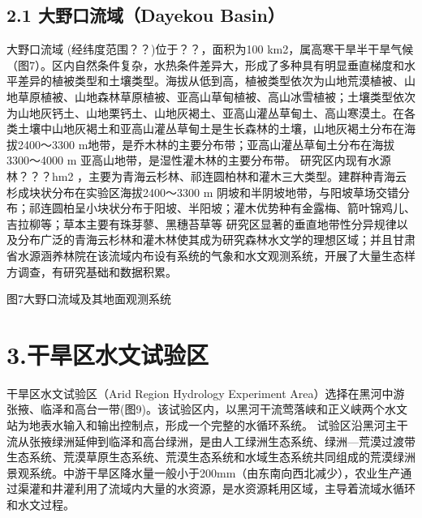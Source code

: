 \documentclass[letterpaper,10pt,english]{sphinxmanual}
\begin{document}
\subsection{2.1 大野口流域（Dayekou Basin）}
\label{water_experiment_area:dayekou-basin}
大野口流域 (经纬度范围？？)位于？？，面积为100 km2，属高寒干旱半干旱气候（图7）。区内自然条件复杂，水热条件差异大，形成了多种具有明显垂直梯度和水平差异的植被类型和土壤类型。海拔从低到高，植被类型依次为山地荒漠植被、山地草原植被、山地森林草原植被、亚高山草甸植被、高山冰雪植被；土壤类型依次为山地灰钙土、山地栗钙土、山地灰褐土、亚高山灌丛草甸土、高山寒漠土。在各类土壤中山地灰褐土和亚高山灌丛草甸土是生长森林的土壤，山地灰褐土分布在海拔2400～3300 m地带，是乔木林的主要分布带；亚高山灌丛草甸土分布在海拔3300～4000 m 亚高山地带，是湿性灌木林的主要分布带。
研究区内现有水源林？？？hm2 ，主要为青海云杉林、祁连圆柏林和灌木三大类型。建群种青海云杉成块状分布在实验区海拔2400～3300 m 阴坡和半阴坡地带，与阳坡草场交错分布；祁连圆柏呈小块状分布于阳坡、半阳坡；灌木优势种有金露梅、箭叶锦鸡儿、吉拉柳等；草本主要有珠芽蓼、黑穗苔草等
研究区显著的垂直地带性分异规律以及分布广泛的青海云杉林和灌木林使其成为研究森林水文学的理想区域；并且甘肃省水源涵养林院在该流域内布设有系统的气象和水文观测系统，开展了大量生态样方调查，有研究基础和数据积累。

图7大野口流域及其地面观测系统


\section{3.干旱区水文试验区}
\label{water_experiment_area:id5}
干旱区水文试验区（Arid Region Hydrology Experiment Area）选择在黑河中游张掖、临泽和高台一带(图9)。该试验区内，以黑河干流莺落峡和正义峡两个水文站为地表水输入和输出控制点，形成一个完整的水循环系统。
试验区沿黑河主干流从张掖绿洲延伸到临泽和高台绿洲，是由人工绿洲生态系统、绿洲—荒漠过渡带生态系统、荒漠草原生态系统、荒漠生态系统和水域生态系统共同组成的荒漠绿洲景观系统。中游干旱区降水量一般小于200mm（由东南向西北减少），农业生产通过渠灌和井灌利用了流域内大量的水资源，是水资源耗用区域，主导着流域水循环和水文过程。
\end{document}
